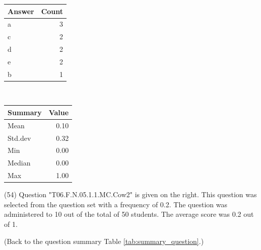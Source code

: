 \documentclass[12pt,english,nohyper]{tufte-handout}\usepackage[]{graphicx}\usepackage[]{color}
\begin{document}
\begin{center}%
\begin{tabular}{lr}
  \hline
Answer & Count \\ 
  \hline
a &   3 \\ 
  c &   2 \\ 
  d &   2 \\ 
  e &   2 \\ 
  b &   1 \\ 
   \hline
\end{tabular}
~~~~~~~~%
\begin{tabular}{lr}
  \hline
Summary & Value \\ 
  \hline
Mean & 0.10 \\ 
  Std.dev & 0.32 \\ 
  Min & 0.00 \\ 
  Median & 0.00 \\ 
  Max & 1.00 \\ 
   \hline
\end{tabular}
\end{center}\newpage{} (54) Question "T06.F.N.05.1.1.MC.Cow2" is given on the right. This question was selected from the question set with a frequency of 0.2. The question was administered to 10 out of the total of 50 students. The average score was 0.2 out of 1.

 (Back to the question summary Table \ref{tab:summary_question}.)
\end{document}
